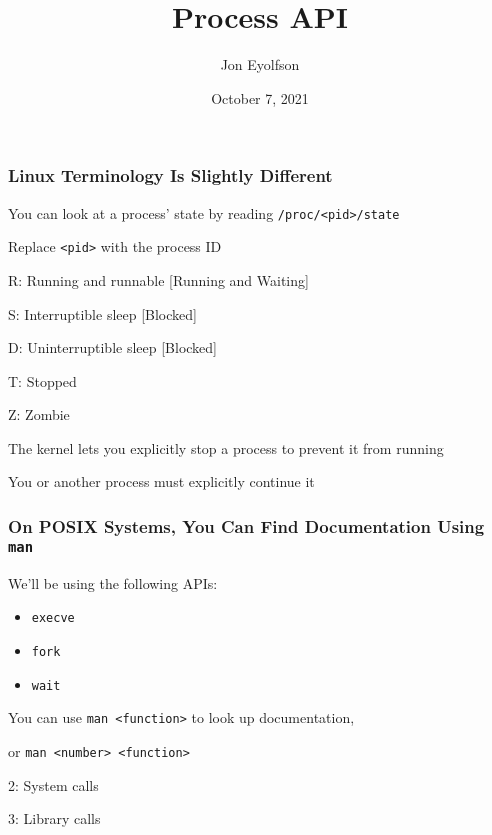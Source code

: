 

\title{Process API}
\author{Jon Eyolfson}
\date{October 7, 2021}


  \begin{frame}
    \titlepage
  \end{frame}

  \begin{frame}
    \frametitle{Linux Terminology Is Slightly Different}

    You can look at a process' state by reading \texttt{/proc/<pid>/state}

    \hspace{2em} Replace \texttt{<pid>} with the process ID

    \vspace{2em}

    R: Running and runnable [Running and Waiting]

    S: Interruptible sleep [Blocked]

    D: Uninterruptible sleep [Blocked]

    T: Stopped

    Z: Zombie

    \vspace{2em}

    The kernel lets you explicitly stop a process to prevent it from running

    \hspace{2em} You or another process must explicitly continue it
  \end{frame}

  \begin{frame}
    \frametitle{On POSIX Systems, You Can Find Documentation Using \texttt{man}}

    We'll be using the following APIs:
    \begin{itemize}
      \item \texttt{execve}
      \item \texttt{fork}
      \item \texttt{wait}
    \end{itemize}

    \vspace{2em}

    You can use \texttt{man <function>} to look up documentation,

    or \texttt{man <number> <function>}

    \hspace{2em} 2: System calls

    \hspace{2em} 3: Library calls
  \end{frame}

